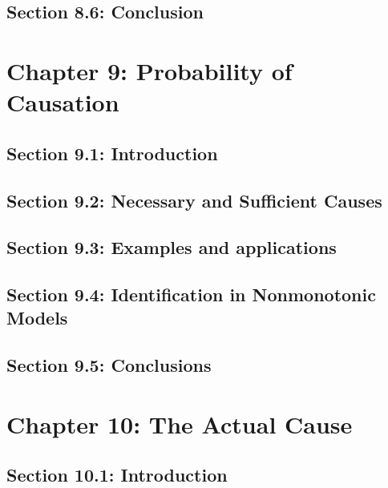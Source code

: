 \documentclass[oneside]{book}
\begin{document}


\section{Section 8.6: Conclusion}



\chapter{Chapter 9: Probability of Causation}

\section{Section 9.1: Introduction}



\section{Section 9.2: Necessary and Sufficient Causes}



\section{Section 9.3: Examples and applications}



\section{Section 9.4: Identification in Nonmonotonic Models}



\section{Section 9.5: Conclusions}



\chapter{Chapter 10: The Actual Cause}

\section{Section 10.1: Introduction}
\end{document}
